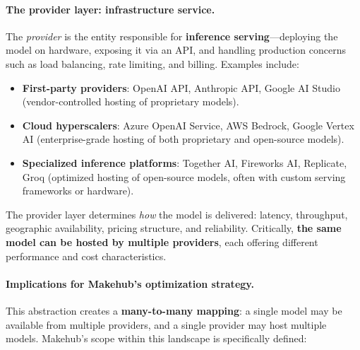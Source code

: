 \documentclass[english]{article}
\begin{document}
\paragraph{The provider layer: infrastructure service.}

The \textit{provider} is the entity responsible for \textbf{inference serving}—deploying the model on hardware, exposing it via an API, and handling production concerns such as load balancing, rate limiting, and billing. Examples include:

\begin{itemize}
    \item \textbf{First-party providers}: OpenAI API, Anthropic API, Google AI Studio (vendor-controlled hosting of proprietary models).
    \item \textbf{Cloud hyperscalers}: Azure OpenAI Service, AWS Bedrock, Google Vertex AI (enterprise-grade hosting of both proprietary and open-source models).
    \item \textbf{Specialized inference platforms}: Together AI, Fireworks AI, Replicate, Groq (optimized hosting of open-source models, often with custom serving frameworks or hardware).
\end{itemize}

The provider layer determines \emph{how} the model is delivered: latency, throughput, geographic availability, pricing structure, and reliability. Critically, \textbf{the same model can be hosted by multiple providers}, each offering different performance and cost characteristics.

\paragraph{Implications for Makehub's optimization strategy.}

This abstraction creates a \textbf{many-to-many mapping}: a single model may be available from multiple providers, and a single provider may host multiple models. Makehub's scope within this landscape is specifically defined:
\end{document}
